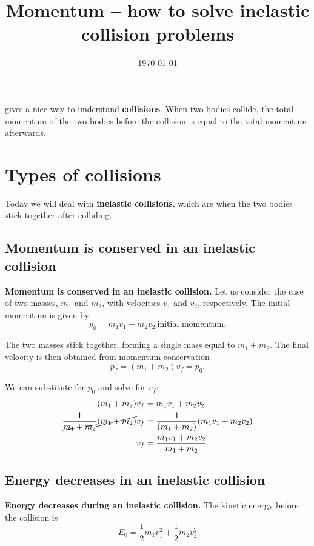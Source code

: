 \documentclass[handout]{tufte-handout}
\title{Momentum -- how to solve inelastic collision problems}
\date{\today}
\author{\mobeardInstructorShort}
\begin{document}
\maketitle

 gives a nice way to understand \textbf{collisions}. When two bodies collide, the total momentum of the two bodies before the collision is equal to the total momentum afterwards. 

\section{Types of collisions}
Today we will deal with \textbf{inelastic collisions}, which are when the two bodies stick together after colliding. 

\subsection{Momentum is conserved in an inelastic collision}
\textbf{Momentum is conserved in an inelastic collision.} Let us consider the case of two masses, $m_1$ and $m_2$, with velocities $v_1$ and $v_2$, respectively. The initial momentum is given by 
\begin{equation}
p_0 = m_1 v_1 + m_2 v_2\ \text{initial momentum}.
\end{equation} 

The two masses stick together, forming a single mass equal to $m_1+m_2$. The final velocity is then obtained from momentum conservation
\begin{equation}
p_f = (m_1 + m_2) v_f = p_0.
\end{equation}
 
 We can substitute for $p_0$ and solve for $v_f$:
 \begin{align}
 (m_1 + m_2) v_f &= m_1 v_1 + m_2 v_2 \\
 \dfrac{1}{\cancel{m_1 + m_2}} \cancel{(m_1 + m_2)} v_f &= \dfrac{1}{(m_1 + m_2)} (m_1 v_1 + m_2 v_2) \\
 v_f &= \dfrac{m_1 v_1 + m_2 v_2}{m_1 + m_2} .
 \end{align}

\subsection{Energy decreases in an inelastic collision}
\textbf{Energy decreases during an inelastic collision.} The kinetic energy before the collision is 
\begin{equation}
E_0 = \frac{1}{2} m_1 v_1^2 + \frac{1}{2} m_2 v_2^2
\end{equation}
\end{document}
